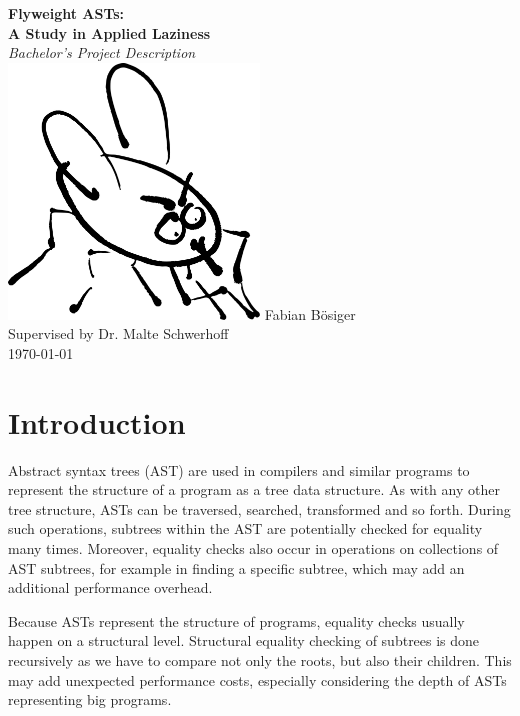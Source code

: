 \documentclass[11pt]{article}
\begin{document}
    \begin{titlepage}
        \begin{center}
            \textbf{\huge Flyweight ASTs:\\A Study in Applied Laziness}\\
            \vspace{0.2cm}
            \textit{Bachelor's Project Description}\\
            \vspace{1cm}
            \includegraphics[width=0.5\textwidth]{fly}
            \vfill   
            Fabian Bösiger\\
            Supervised by Dr. Malte Schwerhoff\\
            \vspace{0.2cm}
            \today
        \end{center}
    \end{titlepage}
    \newpage

    \section{Introduction} \label{introduction}
    Abstract syntax trees (AST) are used in compilers and similar programs to represent
    the structure of a program as a tree data structure. As with any other tree structure,
    ASTs can be traversed, searched, transformed and so forth. During such operations,
    subtrees within the AST are potentially checked for equality many times.  Moreover, equality checks
    also occur in operations on collections of AST subtrees, for example in finding
    a specific subtree, which may add an additional performance overhead.
    
    Because ASTs represent the structure of programs, equality checks usually happen on a structural level.
    Structural equality checking of subtrees is done recursively as we have to compare not only the roots, but also their children. This may add unexpected performance costs,
    especially considering the depth of ASTs representing big programs.
\end{document}
